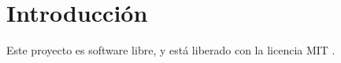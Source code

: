 \chapter{Introducción}

Este proyecto es software libre, y está liberado con la licencia MIT \cite{mit}.